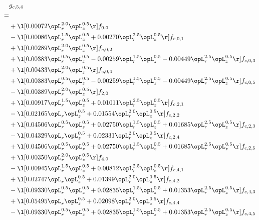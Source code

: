 \begin{alignat}{2} 
\label{eq:g_54_0} 
& g_{c,5,4} \nonumber \\ 
 = \\ 
& + \l[  0.00072 \opL_r^{2.0} \opL_z^{0.5}  \r] f_{0,0} \nonumber \\ 
& - \l[  0.00086 \opL_r^{1.5} \opL_z^{0.5} +  0.00270 \opL_r^{2.5} \opL_z^{0.5}  \r] f_{c,0,1} \nonumber \\ 
& + \l[  0.00289 \opL_r^{2.0} \opL_z^{0.5}  \r] f_{c,0,2} \nonumber \\ 
& + \l[  0.00383 \opL_r^{0.5} \opL_z^{0.5}   -0.00259 \opL_r^{1.5} \opL_z^{0.5}   -0.00449 \opL_r^{2.5} \opL_z^{0.5}  \r] f_{c,0,3} \nonumber \\ 
& + \l[  0.00433 \opL_r^{2.0} \opL_z^{0.5}  \r] f_{c,0,4} \nonumber \\ 
& + \l[  0.00383 \opL_r^{0.5} \opL_z^{0.5}   -0.00259 \opL_r^{1.5} \opL_z^{0.5}   -0.00449 \opL_r^{2.5} \opL_z^{0.5}  \r] f_{c,0,5} \nonumber \\ 
& - \l[  0.00389 \opL_r^{2.0} \opL_z^{0.5}  \r] f_{2,0} \nonumber \\ 
& + \l[  0.00917 \opL_r^{1.5} \opL_z^{0.5} +  0.01011 \opL_r^{2.5} \opL_z^{0.5}  \r] f_{c,2,1} \nonumber \\ 
& - \l[  0.02165 \opL_r \opL_z^{0.5} +  0.01554 \opL_r^{2.0} \opL_z^{0.5}  \r] f_{c,2,2} \nonumber \\ 
& + \l[  0.04506 \opL_r^{0.5} \opL_z^{0.5} +  0.02750 \opL_r^{1.5} \opL_z^{0.5} +  0.01685 \opL_r^{2.5} \opL_z^{0.5}  \r] f_{c,2,3} \nonumber \\ 
& - \l[  0.04329 \opL_r \opL_z^{0.5} +  0.02331 \opL_r^{2.0} \opL_z^{0.5}  \r] f_{c,2,4} \nonumber \\ 
& + \l[  0.04506 \opL_r^{0.5} \opL_z^{0.5} +  0.02750 \opL_r^{1.5} \opL_z^{0.5} +  0.01685 \opL_r^{2.5} \opL_z^{0.5}  \r] f_{c,2,5} \nonumber \\ 
& + \l[  0.00350 \opL_r^{2.0} \opL_z^{0.5}  \r] f_{4,0} \nonumber \\ 
& - \l[  0.00945 \opL_r^{1.5} \opL_z^{0.5} +  0.00812 \opL_r^{2.5} \opL_z^{0.5}  \r] f_{c,4,1} \nonumber \\ 
& + \l[  0.02747 \opL_r \opL_z^{0.5} +  0.01399 \opL_r^{2.0} \opL_z^{0.5}  \r] f_{c,4,2} \nonumber \\ 
& - \l[  0.09330 \opL_r^{0.5} \opL_z^{0.5} +  0.02835 \opL_r^{1.5} \opL_z^{0.5} +  0.01353 \opL_r^{2.5} \opL_z^{0.5}  \r] f_{c,4,3} \nonumber \\ 
& + \l[  0.05495 \opL_r \opL_z^{0.5} +  0.02098 \opL_r^{2.0} \opL_z^{0.5}  \r] f_{c,4,4} \nonumber \\ 
& - \l[  0.09330 \opL_r^{0.5} \opL_z^{0.5} +  0.02835 \opL_r^{1.5} \opL_z^{0.5} +  0.01353 \opL_r^{2.5} \opL_z^{0.5}  \r] f_{c,4,5} \nonumber \\ 
\end{alignat} 


